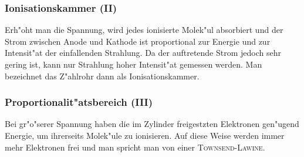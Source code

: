 		\subsubsection{Ionisationskammer (II)}
		\label{subsubsec:ionisationskammer}
			Erh"oht man die Spannung, wird jedes ionisierte Molek"ul absorbiert und der Strom zwischen Anode und Kathode ist proportional zur Energie und zur Intensit"at der einfallenden Strahlung.
			Da der auftretende Strom jedoch sehr gering ist, kann nur Strahlung hoher Intensit"at gemessen werden.
			Man bezeichnet das Z"ahlrohr dann als Ionisationskammer.

		\subsubsection{Proportionalit"atsbereich (III)}
		\label{subsubsec:proportionalitaetsbereich}
			Bei gr"o"serer Spannung haben die im Zylinder freigestzten Elektronen gen"ugend Energie, um ihrerseits Molek"ule zu ionisieren.
			Auf diese Weise werden immer mehr Elektronen frei und man spricht man von einer \textsc{Townsend-Lawine}.


